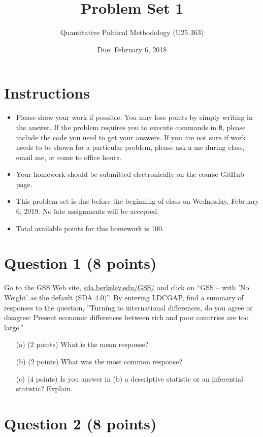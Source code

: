 \documentclass[12pt,letterpaper]{article}
\title{Problem Set 1}
\date{Due: February 6, 2018}
\author{Quantitative Political Methodology (U25 363)}
\begin{document}
	\maketitle
	
	\section*{Instructions}
	\begin{itemize}
		\item Please show your work if possible. You may lose points by simply writing in the answer. If the problem requires you to execute commands in \texttt{R}, please include the code you used to get your answers. If you are not sure if work needs to be shown for a particular problem, please ask a me during class, email me, or come to office hours.
		\item Your homework should be submitted electronically on the course GitHub page.
		\item This problem set is due before the beginning of class on Wednesday, February 6, 2019. No late assignments will be accepted.
		\item Total available points for this homework is 100.
	\end{itemize}
	
	
	\section*{Question 1 (8 points)}
	
	Go to the GSS Web site,  \href{http://sda.berkeley.edu/GSS/}{sda.berkeley.edu/GSS/} and click on “GSS – with ’No Weight’ as the default (SDA 4.0)”. By entering LDCGAP, find a summary of responses to the question, ”Turning to international differences, do you agree or disagree: Present economic differences between rich and poor countries are too large.”
	\begin{itemize}
		\item[(a)] (2 points) What is the mean response?
		\item[(b)] (2 points) What was the most common response?
		\item[(c)] (4 points) Is you answer in (b) a descriptive statistic or an inferential statistic? Explain.
	\end{itemize}
	
	\section*{Question 2 (8 points)}
	
\end{document}
